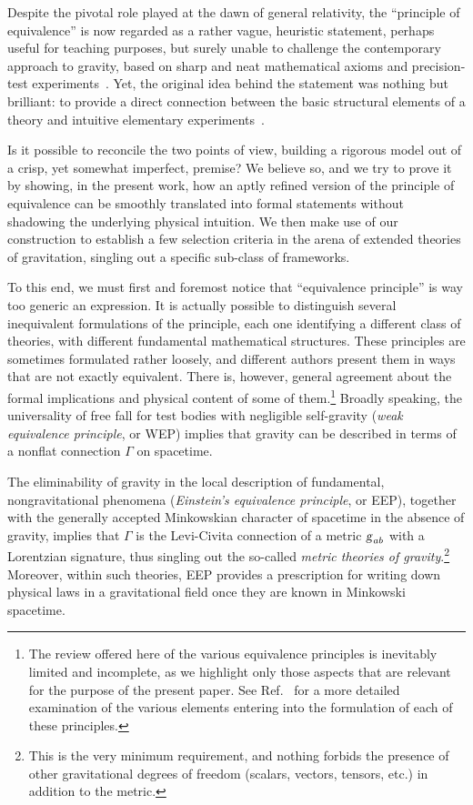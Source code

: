 \documentclass[a4paper,showkeys,aps,prd,reprint,nofootinbib,showpacs,twocolumn]{revtex4-1}
\newcommand{\eq}[1]{\( #1 \)}
\newcommand{\matg}{\text{\textsl{g}}}%
\theoremstyle{plain}
\begin{document}
Despite the pivotal role played at the dawn of general relativity, the ``principle of equivalence'' is now regarded as a rather vague, heuristic statement, perhaps useful for teaching purposes, but surely unable to challenge the contemporary approach to gravity, based on sharp and neat mathematical axioms and precision-test experiments~\cite{will, will2006lr}. Yet, the original idea behind the statement was nothing but brilliant: to provide a direct connection between the basic structural elements of a theory and  intuitive elementary  experiments~\cite{ess1}.

Is it possible to reconcile the two points of view, building a rigorous model out of a crisp, yet somewhat imperfect, premise? We believe so, and we try to prove it by showing, in the present work, how an aptly refined version of the principle of equivalence can be smoothly translated into formal statements without shadowing the underlying physical intuition. We then make use of our construction to establish a few selection criteria in the arena of extended theories of gravitation, singling out a specific sub-class of frameworks.

To this end, we must first and foremost notice that ``equivalence principle'' is way too generic an expression.  It is actually possible to distinguish several inequivalent formulations of the principle, each one identifying a different class of theories, with different fundamental mathematical structures.  These principles are sometimes formulated rather loosely, and different authors present them in ways that are not exactly equivalent.  There is, however, general agreement about the formal implications and physical content of some of them.\footnote{The review offered here of the various equivalence principles is inevitably limited and incomplete, as we highlight only those aspects that are relevant for the purpose of the present paper.  See Ref.~\cite{ess1} for a more detailed examination of the various elements entering into the formulation of each of these principles.}  Broadly speaking, the universality of free fall for test bodies with negligible self-gravity (\emph{weak equivalence principle}, or WEP) implies that gravity can be described in terms of a nonflat connection \eq{\Gamma} on  spacetime.

The eliminability of gravity in the local description of fundamental, nongravitational phenomena (\emph{Einstein's equivalence principle}, or EEP), together with the generally accepted Minkowskian character of spacetime in the absence of gravity, implies that \eq{\Gamma} is the Levi-Civita connection of a metric \eq{\matg_{ab}} with a Lorentzian signature, thus singling out the so-called \emph{metric theories of gravity}.\footnote{This is the very minimum requirement, and nothing forbids the presence of other gravitational degrees of freedom (scalars, vectors, tensors, etc.) in addition to the metric.} Moreover, within such theories, EEP provides a prescription for writing down physical laws in a gravitational field once they are known in Minkowski spacetime.
\end{document}
